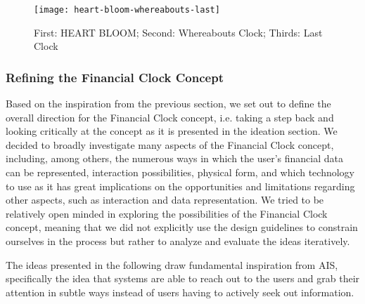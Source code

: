 \begin{figure}[h]
	\centering
	\texttt{[image: heart-bloom-whereabouts-last]}
	\caption{First: HEART BLOOM; Second: Whereabouts Clock; Thirds: Last Clock}
	\label{fig:heart-bloom-whereabouts-last}
\end{figure}

\subsubsection*{Refining the Financial Clock Concept}
\label{sec:refining-the-financial-clock-concept}
Based on the inspiration from the previous section, we set out to define the overall direction for the Financial Clock concept, i.e. taking a step back and looking critically at the concept as it is presented in the ideation section. We decided to broadly investigate many aspects of the Financial Clock concept, including, among others, the numerous ways in which the user’s financial data can be represented, interaction possibilities, physical form, and which technology to use as it has great implications on the opportunities and limitations regarding other aspects, such as interaction and data representation. We tried to be relatively open minded in exploring the possibilities of the Financial Clock concept, meaning that we did not explicitly use the design guidelines to constrain ourselves in the process but rather to analyze and evaluate the ideas iteratively.

The ideas presented in the following draw fundamental inspiration from AIS, specifically the idea that systems are able to reach out to the users and grab their attention in subtle ways instead of users having to actively seek out information.


